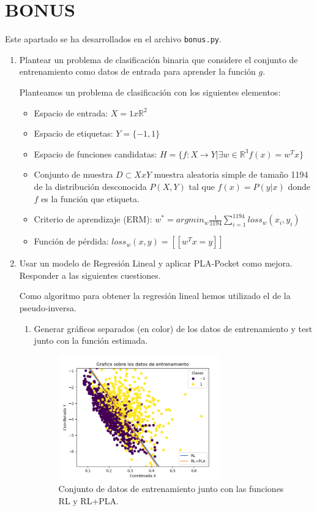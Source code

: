 \documentclass[size=a4, parskip=half, titlepage=false, toc=flat, toc=bib, 12pt]{scrartcl}
\begin{document}
\section{BONUS}
Este apartado se ha desarrollados en el archivo \verb|bonus.py|.

\begin{enumerate}
\item Plantear un problema de clasificación binaria que considere el conjunto de entrenamiento como datos de entrada para aprender la función $g$.

Planteamos un problema de clasificación con los siguientes elementos:
\begin{itemize}
\item Espacio de entrada: $X = {1} x \mathbb{R}^2$
\item Espacio de etiquetas: $Y = \{-1, 1\}$
\item Espacio de funciones candidatas: $H = \{ f:X \rightarrow Y | \exists w \in \mathbb{R}^3 f(x) = w^T x \}$
\item Conjunto de muestra $D \subset X x Y$ muestra aleatoria simple de tamaño 1194 de la distribución desconocida $P(X,Y)$ tal que $f(x) = P(y|x)$ donde $f$ es la función que etiqueta.
\item Criterio de aprendizaje (ERM): $w^* = argmin_w \frac{1}{1194} \sum_{i=1}^{1194} loss_w(x_i,y_i)$
\item Función de pérdida: $loss_w(x,y) = [[w^Tx = y]]$
\end{itemize}

\item Usar un modelo de Regresión Lineal y aplicar PLA-Pocket como mejora. Responder
a las siguientes cuestiones.

Como algoritmo para obtener la regresión lineal hemos utilizado el de la pseudo-inversa.
\begin{enumerate}
\item Generar gráficos separados (en color) de los datos de entrenamiento y test junto
con la función estimada.

\begin{figure}[H]
\centering
{}
\includegraphics[width=0.7\textwidth]{./img/datos}
\caption{Conjunto de datos de entrenamiento junto con las funciones RL y RL+PLA.}
\end{figure}


\end{enumerate}
\end{enumerate}
\end{document}
